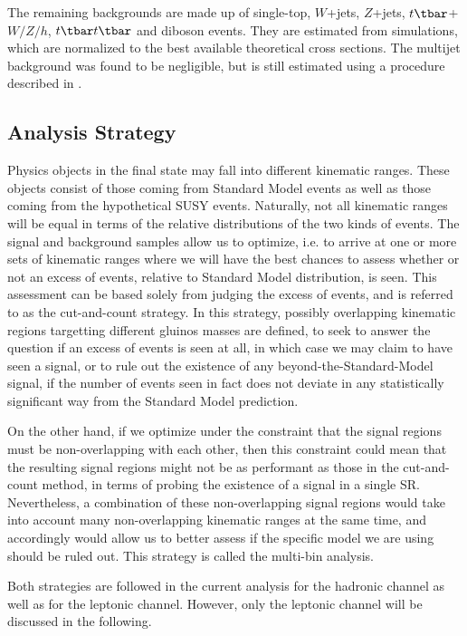 The remaining backgrounds are made up of single-top, $W$+jets, $Z$+jets,
$t\tbar$+$W/Z/h$, $t\tbar t\tbar$ and diboson events. They are estimated from
simulations, which are normalized to the best available theoretical cross
sections. The multijet background was found to be negligible, but is still
estimated using a procedure described in \cite{Aad:2012fqa}.

\subsection{Analysis Strategy}\label{s:mbstra}

Physics objects in the final state may fall into different kinematic ranges.
These objects consist of those coming from Standard Model events as well as
those coming from the hypothetical SUSY events. Naturally, not all kinematic
ranges will be equal in terms of the relative distributions of the two kinds of
events. The signal and background samples allow us to optimize, i.e. to arrive
at one or more sets of kinematic ranges where we will have the best chances to
assess whether or not an excess of events, relative to Standard Model
distribution, is seen. This assessment can be based solely from judging the
excess of events, and is referred to as the cut-and-count strategy. In this 
strategy, possibly overlapping kinematic regions targetting different
gluinos masses are defined, to seek to answer the question if an excess of
events is seen at all, in which case we may claim to have seen a signal, or to
rule out the existence of any beyond-the-Standard-Model signal, if the number
of events seen in fact does not deviate in any statistically significant way
from the Standard Model prediction.

On the other hand, if we optimize under the constraint that the signal regions
must be non-overlapping with each other, then this constraint could mean that
the resulting signal regions might not be as performant as those in the
cut-and-count method, in terms of probing the existence of a signal in a single SR.
Nevertheless, a combination of these non-overlapping signal regions would take
into account many non-overlapping kinematic ranges at the same time, and
accordingly would allow us to better assess if the specific model we are using
should be ruled out. This strategy is called the multi-bin analysis.

Both strategies are followed in the current analysis for the hadronic channel
as well as for the leptonic channel. However, only the leptonic channel will be
discussed in the following.

